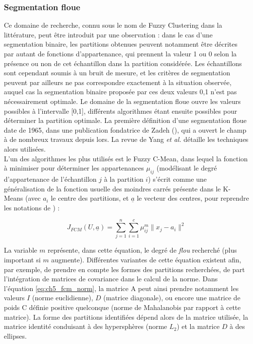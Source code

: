 \subsubsection{Segmentation floue}
Ce domaine de recherche, connu sous le nom de \og Fuzzy Clustering\fg{} dans la littérature, peut être introduit par une observation : dans le cas d'une segmentation \og binaire\fg{}, les partitions obtenues peuvent notamment être décrites par autant de fonctions d'appartenance, qui prennent la valeur 1 ou 0 selon la présence ou non de cet échantillon dans la partition considérée. Les échantillons sont cependant soumis à un bruit de mesure, et les critères de segmentation peuvent par ailleurs ne pas correspondre exactement à la situation observée, auquel cas la segmentation binaire proposée par ces deux valeurs {0,1} n'est pas nécessairement optimale. Le domaine de la segmentation floue ouvre les valeurs possibles à l'intervalle [0,1], différents algorithmes étant ensuite possibles pour déterminer la partition optimale. La première définition d'une segmentation floue date de 1965, dans une publication fondatrice de Zadeh (\cite{Zadeh1965}), qui a ouvert le champ à de nombreux travaux depuis lors. La revue de Yang \textit{et al.} \cite{Yang1993} détaille les techniques alors utilisées.\\
L'un des algorithmes les plus utilisés est le \og Fuzzy C-Mean\fg{}, dans lequel la fonction à minimiser pour déterminer les appartenances $\mu_{ij}$ (modélisant le degré d'appartenance de l'échantillon $j$ à la partition $i$) s'écrit comme une généralisation de la fonction usuelle des moindres carrés présente dans le K-Means (avec $a_i$ le centre des partitions, et $\underline{a}$ le vecteur des centres, pour reprendre les notations de \cite{Yang1993}) :

\begin{equation}
	J_{FCM}(U,\underline{a}) = \sum\limits_{j=1}^{n} \sum\limits_{i=1}^{c} \mu_{ij}^m \lVert x_j - a_i \rVert^2
\end{equation}

La variable $m$ représente, dans cette équation, le degré de \emph{flou} recherché (plus important si $m$ augmente). Différentes variantes de cette équation existent afin, par exemple, de prendre en compte les formes des partitions recherchées, de part l'intégration de matrices de covariance dans le calcul de la norme. Dans l'équation \ref{eq:ch5_fcm_norm}, la matrice A peut ainsi prendre notamment les valeurs $I$ (norme euclidienne), $D$ (matrice diagonale), ou encore une matrice de poids C définie positive quelconque (norme de Mahalanobis par rapport à cette matrice). La forme des partitions identifiées dépend alors de la matrice utilisée, la matrice identité conduisant à des hypersphères (norme $L_2$) et la matrice $D$ à des ellipses.

